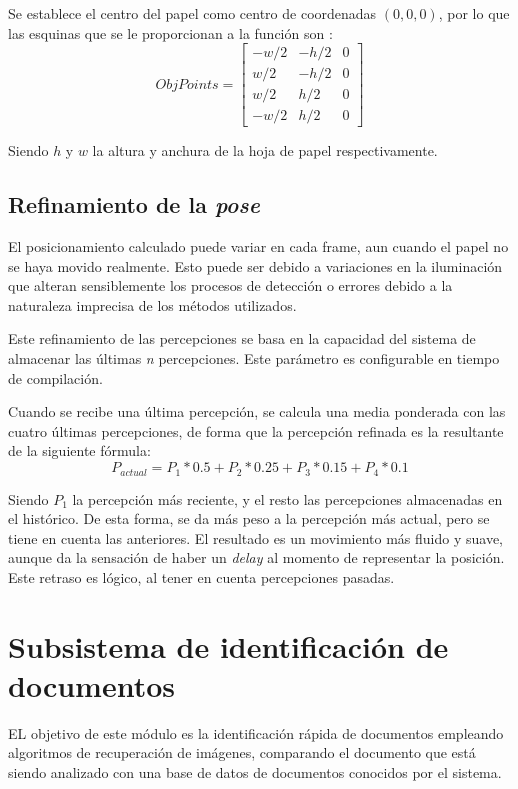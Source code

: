 Se establece el centro del papel como centro de coordenadas $(0,0,0)$, por lo que las esquinas que se le proporcionan a la función son :
\begin{equation}
  ObjPoints =\begin{bmatrix} -w/2 & -h/2 & 0 \\
    w/2 & -h/2 & 0 \\
    w/2 &  h/2 & 0 \\
    -w/2 &  h/2 & 0
  \end{bmatrix}
\end{equation}

Siendo $h$ y $w$ la altura y anchura de la hoja de papel respectivamente. 


\subsection{Refinamiento de la \emph{pose}}
El posicionamiento calculado puede variar en cada frame, aun cuando el papel no se haya movido
realmente. Esto puede ser debido a variaciones en la iluminación que alteran sensiblemente los
procesos de detección o errores debido a la naturaleza imprecisa de los métodos utilizados.

Este refinamiento de las percepciones se basa en la capacidad del sistema de almacenar las últimas
\textit{n} percepciones. Este parámetro es configurable en tiempo de compilación.

Cuando se recibe una última percepción, se calcula una media ponderada con las cuatro últimas
percepciones, de forma que la percepción refinada es la resultante de la siguiente fórmula:
\begin{equation}
P_{actual} = P_1*0.5 + P_2*0.25 + P_3*0.15 + P_4*0.1
\end{equation}

Siendo $P_1$ la percepción más reciente, y el resto las percepciones almacenadas en el histórico. De esta forma, se da más peso a la percepción más actual, pero se tiene en cuenta las anteriores. El resultado es un movimiento más fluido y suave, aunque da la sensación de haber un \textit{delay} al momento de representar la posición. Este retraso es lógico, al tener en cuenta percepciones pasadas.

\section{Subsistema de identificación de documentos}
EL objetivo de este módulo es la identificación rápida de documentos empleando algoritmos de
recuperación de imágenes, comparando el documento que está siendo analizado con una base de datos de
documentos conocidos por el sistema.

